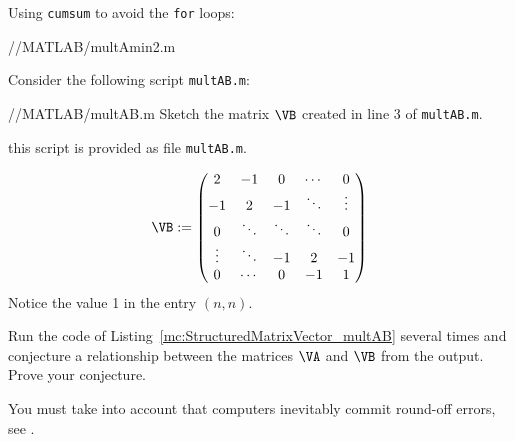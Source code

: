\begin{problem}
\begin{subproblem}[3]
\begin{solution}
Using \texttt{cumsum} to avoid the \texttt{for} loops:

{\problems/\chpt/MATLAB/multAmin2.m}
\end{solution}
\end{subproblem}

\begin{subproblem}[1]  \label{subprb:StructuredMatrixVector_6}
 Consider the following \Matlab script \texttt{multAB.m}:
%

{\problems/\chpt/MATLAB/multAB.m}
%
Sketch the matrix $\VB$ created in line 3 of \texttt{multAB.m}.

\begin{hint}
this \Matlab script is provided as file \texttt{multAB.m}.
\end{hint}

\begin{solution}
$$\VB:= \begin{pmatrix}
 2 & -1 &  0 & \cdots & 0 \\
-1 &  2 & -1 & \ddots & \vdots \\
 0 & \ddots & \ddots & \ddots & 0\\
\vdots & \ddots& -1 & 2 & -1\\
 0 & \cdots & 0 & -1 & 1
\end{pmatrix}$$
%
Notice the value 1 in the entry $(n,n)$.
\end{solution}
\end{subproblem}

\begin{subproblem}[2] \label{subprb:StructuredMatrixVector_7}
Run the code of
Listing~\ref{mc:StructuredMatrixVector_multAB} several times and conjecture a
relationship between the matrices $\VA$ and $\VB$ from the output. Prove your
conjecture.

\begin{hint}
You must take into account that computers inevitably commit round-off errors, see
.
\end{hint}


\end{subproblem}
\end{problem}
